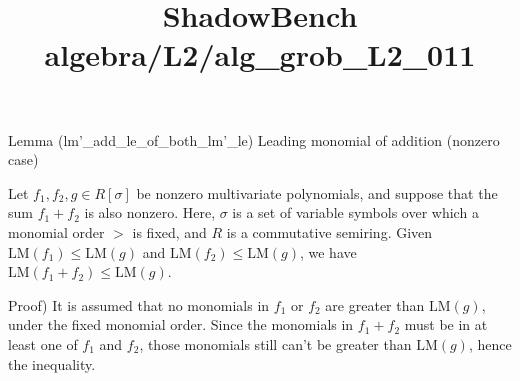 \documentclass{article}
\title{ShadowBench algebra/L2/alg\_grob\_L2\_011}
\begin{document}
\maketitle

Lemma (lm'_add_le_of_both_lm'_le)
Leading monomial of addition (nonzero case)

Let $f_1, f_2, g \in R[\sigma]$ be nonzero multivariate polynomials, and suppose that the sum $f_1 + f_2$ is also nonzero. Here, $\sigma$ is a set of variable symbols over which a monomial order $>$ is fixed, and $R$ is a commutative semiring. Given $\mathrm{LM}(f_1) \le \mathrm{LM}(g)$ and $\mathrm{LM}(f_2) \le \mathrm{LM}(g)$, we have $\mathrm{LM}(f_1 + f_2) \le \mathrm{LM}(g)$.

Proof)
It is assumed that no monomials in $f_1$ or $f_2$ are greater than $\mathrm{LM}(g)$, under the fixed monomial order. Since the monomials in $f_1 + f_2$ must be in at least one of $f_1$ and $f_2$, those monomials still can't be greater than $\mathrm{LM}(g)$, hence the inequality.
\end{document}
